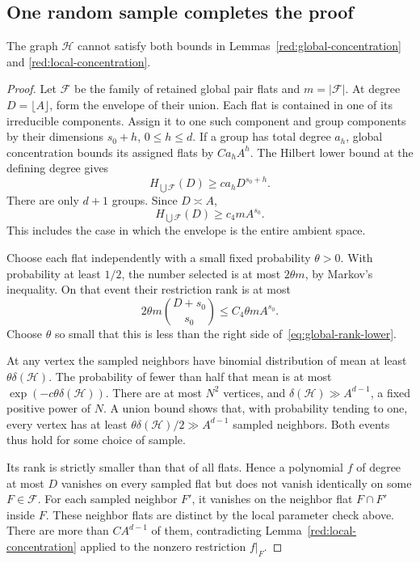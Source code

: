 \subsection{One random sample completes the proof}

\begin{proposition}\label{red:main-contradiction}
The graph \(\mathcal H\) cannot satisfy both bounds in
Lemmas~\ref{red:global-concentration} and
\ref{red:local-concentration}.
\end{proposition}

\begin{proof}
Let \(\mathcal F\) be the family of retained global pair flats and
\(m=|\mathcal F|\). At degree \(D=\lfloor A\rfloor\), form the
envelope of their union. Each flat is contained in one of its
irreducible components. Assign it to one such component and group
components by their dimensions \(s_0+h\), \(0\le h\le d\).
If a group has total degree \(a_h\), global concentration bounds its
assigned flats by \(C a_h A^h\). The Hilbert lower bound at the
defining degree gives
\[
 H_{\bigcup\mathcal F}(D)
 \ge c a_hD^{s_0+h}.
\]
There are only \(d+1\) groups. Since \(D\asymp A\),
\begin{equation}\label{eq:global-rank-lower}
 H_{\bigcup\mathcal F}(D)\ge c_4mA^{s_0}.
\end{equation}
This includes the case in which the envelope is the entire ambient
space.

Choose each flat independently with a small fixed probability
\(\theta>0\). With probability at least \(1/2\), the number selected
is at most \(2\theta m\), by Markov's inequality.
On that event their restriction rank is at most
\[
 2\theta m\binom{D+s_0}{s_0}\le C_4\theta m A^{s_0}.
\]
Choose \(\theta\) so small that this is less than the right side
of~\eqref{eq:global-rank-lower}.

At any vertex the sampled neighbors have binomial distribution of
mean at least \(\theta\delta(\mathcal H)\). The probability of fewer
than half that mean is at most
\(\exp(-c\theta\delta(\mathcal H))\).
There are at most \(N^2\) vertices, and
\(\delta(\mathcal H)\gg A^{d-1}\), a fixed positive power of \(N\).
A union bound shows that, with probability tending to one, every
vertex has at least
\(\theta\delta(\mathcal H)/2\gg A^{d-1}\) sampled neighbors.
Both events thus hold for some choice of sample.

Its rank is strictly smaller than that of all flats. Hence a
polynomial \(f\) of degree at most \(D\) vanishes on every sampled
flat but does not vanish identically on some \(F\in\mathcal F\).
For each sampled neighbor \(F'\), it vanishes on the neighbor flat
\(F\cap F'\) inside \(F\). These neighbor flats are distinct by the
local parameter check above. There are more than \(C A^{d-1}\)
of them, contradicting Lemma~\ref{red:local-concentration} applied
to the nonzero restriction \(f|_F\).
\end{proof}

